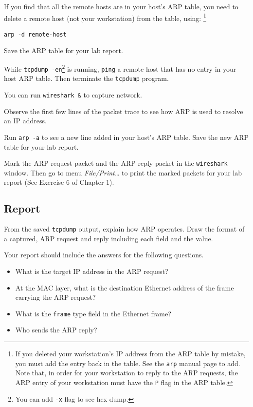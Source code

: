 \documentclass{../UTNetLab}
\begin{document}
    If you find that all the remote hosts are in your host’s ARP table, you need to delete a remote host (not your workstation) from the table, using:
    \footnote{If you deleted your workstation’s IP address from the ARP table by mistake, you must add the entry back in the table. See the \lstinline{arp} manual page to add.
    Note that, in order for your workstation to reply to the ARP requests, the ARP entry of your workstation must have the \lstinline{P} flag in the ARP table.}
    \begin{lstlisting}[emph={remote-host}]
arp -d remote-host
    \end{lstlisting}

    Save the ARP table for your lab report.

    While \lstinline{tcpdump -en}\footnote{You can add \lstinline{-x} flag to see hex dump.} is running, \lstinline{ping} a remote host that has no entry in your host ARP table.
    Then terminate the \lstinline{tcpdump} program.

    You can run \lstinline{wireshark &} to capture network.

    Observe the first few lines of the packet trace to see how ARP is used to resolve an IP address.

    Run \lstinline{arp -a} to see a new line added in your host’s ARP table.
    Save the new ARP table for your lab report.

    Mark the ARP request packet and the ARP reply packet in the \lstinline{wireshark} window.
    Then go to menu \textit{File/Print\ldots} to print the marked packets for your lab report (See Exercise 6 of Chapter 1).

    \subsection*{Report}
    From the saved \lstinline{tcpdump} output, explain how ARP operates.
    Draw the format of a captured, ARP request and reply including each field and the value.

    Your report should include the answers for the following questions.
    \begin{itemize}
        \item What is the target IP address in the ARP request?
        \item At the MAC layer, what is the destination Ethernet address of the frame carrying the ARP request?
        \item What is the \texttt{frame} type field in the Ethernet frame?
        \item Who sends the ARP reply?
    \end{itemize}
\end{document}
